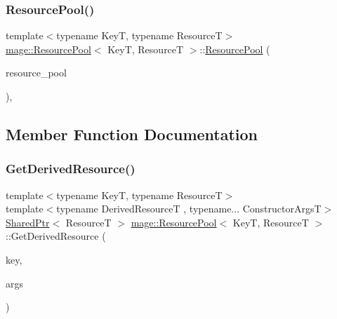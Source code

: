 \hypertarget{classmage_1_1_resource_pool_a4ab8e492c60297ca2435aced3b95053a}{}\label{classmage_1_1_resource_pool_a4ab8e492c60297ca2435aced3b95053a} 
\subsubsection{\texorpdfstring{Resource\+Pool()}{ResourcePool()}\hspace{0.1cm}{\footnotesize\ttfamily [3/3]}}
{\footnotesize\ttfamily template$<$typename KeyT, typename ResourceT$>$ \\
\hyperlink{classmage_1_1_resource_pool}{mage\+::\+Resource\+Pool}$<$ KeyT, ResourceT $>$\+::\hyperlink{classmage_1_1_resource_pool}{Resource\+Pool} (\begin{DoxyParamCaption}\item[{\hyperlink{classmage_1_1_resource_pool}{Resource\+Pool}$<$ KeyT, ResourceT $>$ \&\&}]{resource\+\_\+pool }\end{DoxyParamCaption})\hspace{0.3cm}{\ttfamily [private]}, {\ttfamily [delete]}}



\subsection{Member Function Documentation}
\hypertarget{classmage_1_1_resource_pool_a2c1116cecf0a88953fa681f254de8680}{}\label{classmage_1_1_resource_pool_a2c1116cecf0a88953fa681f254de8680} 
\subsubsection{\texorpdfstring{Get\+Derived\+Resource()}{GetDerivedResource()}}
{\footnotesize\ttfamily template$<$typename KeyT, typename ResourceT$>$ \\
template$<$typename Derived\+ResourceT , typename... Constructor\+ArgsT$>$ \\
\hyperlink{namespacemage_a1e01ae66713838a7a67d30e44c67703e}{Shared\+Ptr}$<$ ResourceT $>$ \hyperlink{classmage_1_1_resource_pool}{mage\+::\+Resource\+Pool}$<$ KeyT, ResourceT $>$\+::Get\+Derived\+Resource (\begin{DoxyParamCaption}\item[{KeyT}]{key,  }\item[{Constructor\+ArgsT \&\&...}]{args }\end{DoxyParamCaption})}

